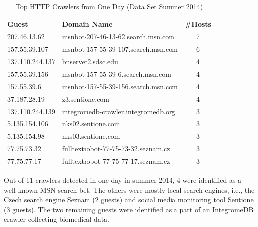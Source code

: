 \begin{table}[ht]
\centering
\begin{tabular}{| l | l | c |} \hline
Guest & Domain Name & \#Hosts \\ \hline
207.46.13.62    & msnbot-207-46-13-62.search.msn.com  & 7 \\ \hline
157.55.39.107   & msnbot-157-55-39-107.search.msn.com & 6 \\ \hline
137.110.244.137 & bnserver2.sdsc.edu                  & 4 \\ \hline
157.55.39.156   & msnbot-157-55-39-6.search.msn.com   & 4 \\ \hline
157.55.39.6 & msnbot-157-55-39-156.search.msn.com & 4 \\ \hline
37.187.28.19    & z3.sentione.com                     & 4 \\ \hline
137.110.244.139 & integromedb-crawler.integromedb.org & 3 \\ \hline
5.135.154.106   & nks02.sentione.com                  & 3 \\ \hline
5.135.154.98    & nks03.sentione.com                  & 3 \\ \hline
77.75.73.32 & fulltextrobot-77-75-73-32.seznam.cz & 3 \\ \hline
77.75.77.17 & fulltextrobot-77-75-77-17.seznam.cz & 3 \\ \hline
\end{tabular}
\caption{Top HTTP Crawlers from One Day (Data Set Summer 2014)}
\label{tab:httpsecurity-crawlers}
\end{table}

Out of 11 crawlers detected in one day in summer 2014, 4 were identified as a well-known MSN search bot. The others were mostly local search engines, i.e., the Czech search engine Seznam (2 guests) and social media monitoring tool Sentione (3 guests). The two remaining guests were identified as a part of an IntegromeDB crawler collecting biomedical data.

